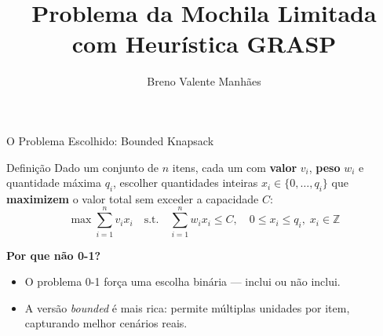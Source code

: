 \documentclass[aspectratio=169]{beamer}
\title[Mochila Limitada com GRASP]{Problema da Mochila Limitada\\com Heurística GRASP}
\author{Breno Valente Manhães}
\institute{Otimização Aplicada a Redes \\ UFRJ}
\date{}
\begin{document}

\begin{frame}
  \titlepage
\end{frame}

\begin{frame}{O Problema Escolhido: Bounded Knapsack}

  \begin{block}{Definição}
    Dado um conjunto de $n$ itens, cada um com \textbf{valor} $v_i$, \textbf{peso} $w_i$
    e quantidade máxima $q_i$, escolher quantidades inteiras $x_i \in \{0, \ldots, q_i\}$
    que \textbf{maximizem} o valor total sem exceder a capacidade $C$:
    \[
      \max \sum_{i=1}^n v_i x_i \quad \text{s.t.} \quad
      \sum_{i=1}^n w_i x_i \leq C, \quad 0 \leq x_i \leq q_i, \; x_i \in \mathbb{Z}
    \]
  \end{block}

  \vspace{0.5em}
      \textbf{Por que não 0-1?}
      \begin{itemize}
        \item O problema 0-1 força uma escolha binária --- inclui ou não inclui.
        \item A versão \emph{bounded} é mais rica: permite múltiplas unidades por item,
              capturando melhor cenários reais.
      \end{itemize}

\end{frame}
\end{document}
